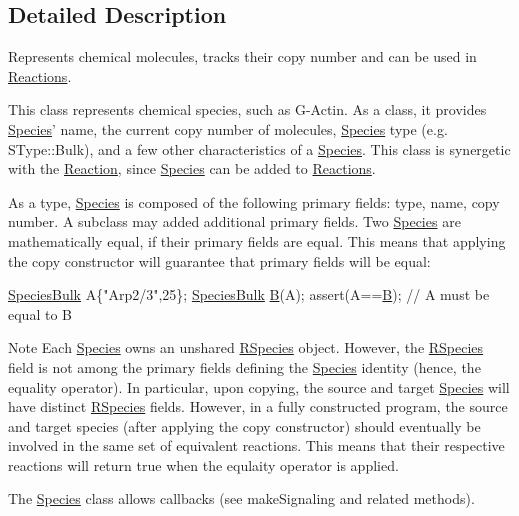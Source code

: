 \subsection{Detailed Description}
Represents chemical molecules, tracks their copy number and can be used in \hyperlink{classReaction}{Reactions}. 

This class represents chemical species, such as G-\/\+Actin. As a class, it provides \hyperlink{classSpecies}{Species}' name, the current copy number of molecules, \hyperlink{classSpecies}{Species} type (e.\+g. S\+Type\+::\+Bulk), and a few other characteristics of a \hyperlink{classSpecies}{Species}. This class is synergetic with the \hyperlink{classReaction}{Reaction}, since \hyperlink{classSpecies}{Species} can be added to \hyperlink{classReaction}{Reactions}.

As a type, \hyperlink{classSpecies}{Species} is composed of the following primary fields\+: type, name, copy number. A subclass may added additional primary fields. Two \hyperlink{classSpecies}{Species} are mathematically equal, if their primary fields are equal. This means that applying the copy constructor will guarantee that primary fields will be equal\+: 
\begin{DoxyCode}
\hyperlink{classSpeciesBulk}{SpeciesBulk} A\{\textcolor{stringliteral}{"Arp2/3"},25\};
\hyperlink{classSpeciesBulk}{SpeciesBulk} \hyperlink{namespaceA__B__C__Cycle_a9771d340c90ea87ee784c884fe2de3dc}{B}(A);
assert(A==\hyperlink{namespaceA__B__C__Cycle_a9771d340c90ea87ee784c884fe2de3dc}{B}); \textcolor{comment}{// A must be equal to B}
\end{DoxyCode}


\begin{DoxyNote}{Note}
Each \hyperlink{classSpecies}{Species} owns an unshared \hyperlink{classRSpecies}{R\+Species} object. However, the \hyperlink{classRSpecies}{R\+Species} field is not among the primary fields defining the \hyperlink{classSpecies}{Species} identity (hence, the equality operator). In particular, upon copying, the source and target \hyperlink{classSpecies}{Species} will have distinct \hyperlink{classRSpecies}{R\+Species} fields. However, in a fully constructed program, the source and target species (after applying the copy constructor) should eventually be involved in the same set of equivalent reactions. This means that their respective reactions will return true when the equlaity operator is applied.

The \hyperlink{classSpecies}{Species} class allows callbacks (see make\+Signaling and related methods). 
\end{DoxyNote}


